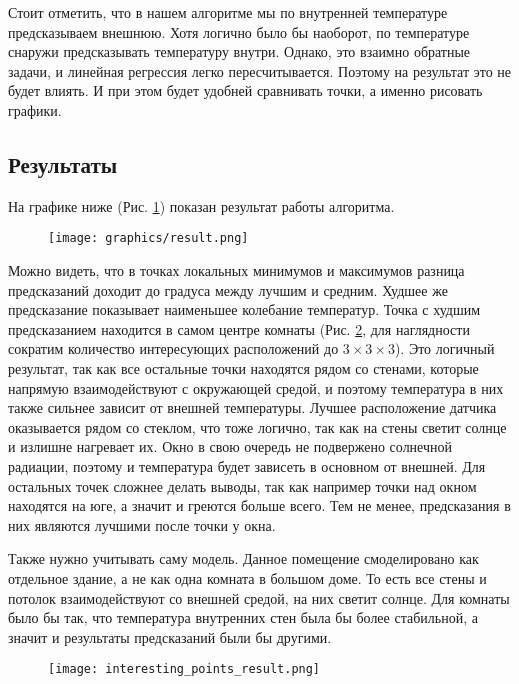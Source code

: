Стоит отметить, что в нашем алгоритме мы по внутренней температуре предсказываем внешнюю. Хотя логично было бы наоборот, по температуре снаружи предсказывать температуру внутри. Однако, это взаимно обратные задачи, и линейная регрессия легко пересчитывается. Поэтому на результат это не будет влиять. И при этом будет удобней сравнивать точки, а именно рисовать графики.

\newpage

\subsection{Результаты}

На графике ниже (Рис. \ref{result}) показан результат работы алгоритма. 

\begin{figure}[H]
\centering
\texttt{[image: graphics/result.png]}
\caption{}
\label{result}
\end{figure}

Можно видеть, что в точках локальных минимумов и максимумов разница предсказаний доходит до градуса между лучшим и средним. Худшее же предсказание показывает наименьшее колебание температур. Точка с худшим предсказанием находится в самом центре комнаты (Рис. \ref{interesting-points-result}, для наглядности сократим количество интересующих расположений до $3 \times 3 \times 3$). Это логичный результат, так как все остальные точки находятся рядом со стенами, которые напрямую взаимодействуют с окружающей средой, и поэтому температура в них также сильнее зависит от внешней температуры. Лучшее расположение датчика оказывается рядом со стеклом, что тоже логично, так как на стены светит солнце и излишне нагревает их. Окно в свою очередь не подвержено солнечной радиации, поэтому и температура будет зависеть в основном от внешней. Для остальных точек сложнее делать выводы, так как например точки над окном находятся на юге, а значит и греются больше всего. Тем не менее, предсказания в них являются лучшими после точки у окна.

Также нужно учитывать саму модель. Данное помещение смоделировано как отдельное здание, а не как одна комната в большом доме. То есть все стены и потолок взаимодействуют со внешней средой, на них светит солнце. Для комнаты было бы так, что температура внутренних стен была бы более стабильной, а значит и результаты предсказаний были бы другими.


\begin{figure}[H]
\centering
\texttt{[image: interesting\_points\_result.png]}
\caption{}
\label{interesting-points-result}
\end{figure}








































